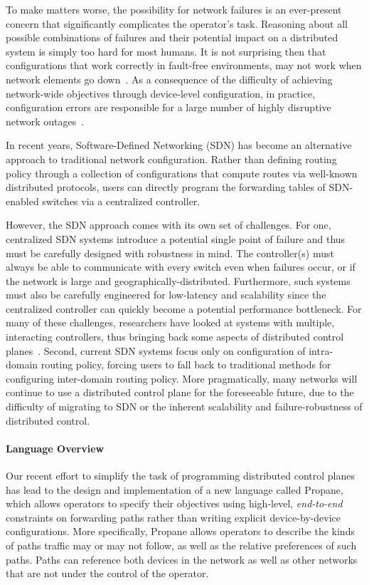 \documentclass[10pt]{sig-alternate}
\newcommand{\sysname}{{\small \sf Propane}\xspace}
\newcommand{\para}[1]{\paragraph*{\textbf{#1}}}
\begin{document}
To make matters worse, the possibility for network failures is an 
ever-present concern that significantly complicates the operator's task. 
Reasoning about all possible combinations of failures
and their potential impact on a distributed system is simply too hard for most humans. 
It is not surprising then that configurations that work correctly in fault-free 
environments, may not work when network elements go down~\cite{batfish}.
%
As a consequence of the difficulty of achieving network-wide objectives through device-level configuration, in practice, configuration errors are responsible for a large number of highly disruptive network outages~\cite{time-warner,batfish,mahajan+:bgp-misconfiguration,yankee-study,juniper-study}.

In recent years, Software-Defined Networking (SDN) has become an alternative 
approach to traditional network configuration. Rather than defining routing policy
through a collection of configurations that compute routes via well-known distributed
protocols, users can directly program the forwarding tables of SDN-enabled switches via
a centralized controller.

However, the SDN approach comes with its own set of challenges. For one, centralized SDN systems introduce a potential single point of failure and thus must be carefully designed with robustness in mind. The controller(s) must always be able to communicate with every switch even when failures occur, or if the network is large and geographically-distributed. Furthermore, such systems must also be carefully engineered for low-latency and scalability since the centralized controller can quickly become a potential performance bottleneck. For many of these challenges, researchers have looked at systems with multiple, interacting controllers, thus bringing back some aspects of distributed
control planes~\cite{onos,mccauley2013extending}.
Second, current SDN systems focus only on configuration of intra-domain routing policy, forcing users to fall back to traditional methods for configuring inter-domain routing policy.
More pragmatically, many networks will continue to use a distributed control plane for the foreseeable future, due to the difficulty of migrating to SDN or the inherent scalability and failure-robustness of distributed control.

\para{Language Overview}
Our recent effort to simplify the task of programming distributed control planes has lead to the design and implementation of a new language called \sysname, which allows operators to specify their objectives using high-level, \emph{end-to-end} constraints on forwarding paths rather than writing explicit device-by-device configurations.
%
More specifically, \sysname allows operators to describe the kinds of paths traffic may or may not follow, as well as the relative preferences of such paths. Paths can reference both devices in the network as well as other networks that are not under the control of the operator. 
\end{document}
